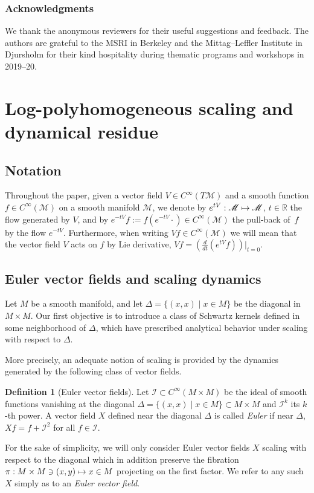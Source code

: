\documentclass[JEP,XML,SOM,Unicode]{cedram}
\let\pazocal\mathscr
\def\mto{\mathchoice{\longmapsto}{\mapsto}{\mapsto}{\mapsto}}
\theoremstyle{definition}
\newtheorem{definition}[theorem]{Definition}
\let\st\mid
\let\euler X
\begin{document}
\subsubsection*{Acknowledgments}
We thank the anonymous reviewers for their useful suggestions and feedback. The authors are grateful to the MSRI in Berkeley and the Mittag--Leffler Institute in Djursholm for their kind hospitality during thematic programs and workshops in 2019--20.

\section{Log-polyhomogeneous scaling and dynamical residue}\label{section2}

\subsection{Notation}
Throughout the paper, given a vector field $V\in C^\infty(T\pazocal{M})$ and a smooth function $f\in C^\infty(\pazocal{M})$ on a smooth manifold $\pazocal{M}$, we denote by $e^{tV}:\pazocal{M}\mto \pazocal{M}$, $t\in \mathbb{R}$ the flow generated by $V$, and by $e^{-tV}f:=f(e^{-tV}\cdot)\in C^\infty(\pazocal{M})$ the pull-back of~$f$ by the flow $e^{-tV}$. Furthermore, when writing $Vf\in C^\infty(\pazocal{M})$ we will mean that the vector field $V$ acts on $f$ by {Lie derivative}, \ie $Vf=\left(\frac{d}{dt}\left(e^{tV}f\right)\right)|_{t=0}$.

\subsection{Euler vector fields and scaling dynamics}\label{ss:euler}

Let $M$ be a smooth manifold, and let $\Delta=\{(x,x) \st x\in M\}$ be the diagonal in $M\times M$. Our first objective is to introduce a class of
Schwartz kernels defined in some neighborhood of $\Delta$,
which have prescribed
analytical
behavior under scaling with respect to $\Delta$.

More precisely, an adequate notion of scaling is provided by the dynamics generated by the following class of vector fields.

\begin{definition}[Euler vector fields]
Let $\pazocal{I}\subset C^\infty(M\times M)$ be the ideal of smooth functions
vanishing at the diagonal $\Delta=\{(x,x) \st x\in M\}\subset M\times M$ and $\pazocal{I}^k$ its $k$-th power.
A vector field $\euler$ defined near the diagonal $\Delta$
is called \emph{Euler} if near $\Delta$, $\euler f=f+\pazocal{I}^2$ for all $f\in \pazocal{I}$.

For the sake of simplicity, we will only consider Euler vector fields $X$ scaling with respect to the diagonal which in addition preserve the fibration
$\pi: M\times M \ni (x,y)\mto x\in M$
projecting on the first factor. We refer to any such $\euler$ simply as to an \emph{Euler vector field}.
\end{definition}
\end{document}

